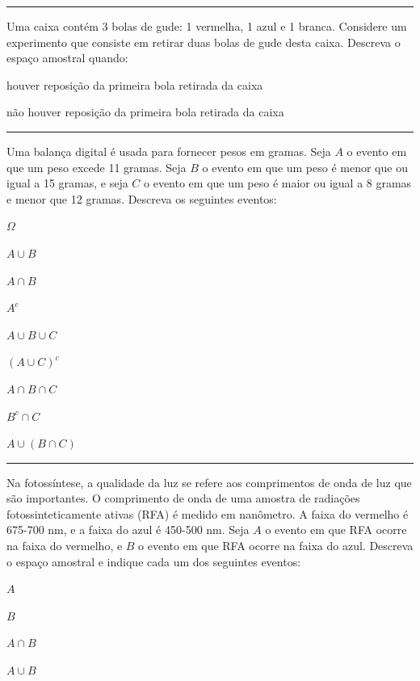 \documentclass[a4paper,11pt,fleqn]{article}\usepackage[]{graphicx}\usepackage[]{color}
\theoremstyle{definition}
\begin{document}
\begin{compactenum}
\vspace{0.3cm}
\hrule
\vspace{0.3cm}

\item Uma caixa contém 3 bolas de gude: 1 vermelha, 1 azul e 1
  branca. Considere um experimento que consiste em retirar duas bolas de
  gude desta caixa. Descreva o espaço amostral quando:
  \begin{compactenum}
  \item houver reposição da primeira bola retirada da caixa
  \item não houver reposição da primeira bola retirada da caixa
  \end{compactenum}

\vspace{0.3cm}
\hrule
\vspace{0.3cm}

\item Uma balança digital é usada para fornecer pesos em gramas. Seja
  $A$ o evento em que um peso excede 11 gramas. Seja $B$ o evento em que
  um peso é menor que ou igual a 15 gramas, e seja $C$ o evento em que
  um peso é maior ou igual a 8 gramas e menor que 12 gramas. Descreva os
  seguintes eventos: \\
  \begin{inparaenum}
  \item $\Omega$ \,
  \item $A \cup B$ \,
  \item $A \cap B$ \,
  \item $A^{c}$ \,
  \item $A \cup B \cup C$ \,
  \item $(A \cup C)^{c}$ \,
  \item $A \cap B \cap C$ \,
  \item $B^{c} \cap C$ \,
  \item $A \cup (B \cap C)$
  \end{inparaenum}

\vspace{0.3cm}
\hrule
\vspace{0.3cm}

\item Na fotossíntese, a qualidade da luz se refere aos comprimentos de
  onda de luz que são importantes. O comprimento de onda de uma amostra
  de radiações fotossinteticamente ativas (RFA) é medido em nanômetro. A
  faixa do vermelho é 675-700 nm, e a faixa do azul é 450-500 nm. Seja
  $A$ o evento em que RFA ocorre na faixa do vermelho, e $B$ o evento em
  que RFA ocorre na faixa do azul. Descreva o espaço amostral e indique
  cada um dos seguintes eventos: \\
  \begin{inparaenum}
  \item $A$ \,
  \item $B$ \,
  \item $A \cap B$ \,
  \item $A \cup B$
  \end{inparaenum}


\end{compactenum}
\end{document}
